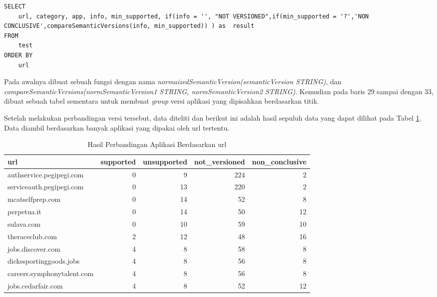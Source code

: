 \begin{lstlisting}[caption={Menampilkan Hasil dari Perbandingan Versi}, label={lst:showitem}]
SELECT 
	url, category, app, info, min_supported, if(info = '', "NOT VERSIONED",if(min_supported = '?','NON CONCLUSIVE',compareSemanticVersions(info, min_supported)) ) as  result
FROM 
	test 
ORDER BY 
	url
\end{lstlisting}
Pada awalnya dibuat sebuah fungsi dengan nama \textit{normaizedSemanticVersion(semanticVersion STRING)}, dan \textit{compareSemanticVersions(normSemanticVersion1 STRING, normSemanticVersion2 STRING)}. Kemudian pada baris 29 sampai dengan 33, dibuat sebuah tabel sementara untuk membuat \textit{group} versi aplikasi yang dipisahkan berdasarkan titik.


Setelah melakukan perbandingan versi tersebut, data diteliti dan berikut ini adalah hasil sepuluh data yang dapat dilihat pada Tabel \ref{table:contoh_langkah5.1}. Data diambil berdasarkan banyak aplikasi yang dipakai oleh url tertentu. 
\begin{table}[H]
\centering
\begin{tabular}{|l|r|r|r|r|}
	\hline
	\textbf{url} & \textbf{supported} & \textbf{unsupported} & \textbf{not\_versioned} & \textbf{non\_conclusive}\\
	\hline
	authservice.pegipegi.com & 0 & 9 & 224 & 2\\
	\hline
	serviceauth.pegipegi.com & 0 & 13 & 220 & 2\\
	\hline
	mcatselfprep.com &0 & 14 & 52 & 8\\
	\hline
	perpetua.it & 0 & 14 & 50 & 12\\
	\hline
	sulava.com & 0 & 10 & 59 & 10\\
	\hline
	
	theraceclub.com & 2 & 12 & 48 & 16\\
	\hline
	
	jobs.discover.com & 4 & 8 & 58 & 8\\
	\hline
	
	dickssportinggoods.jobs & 4 & 8 & 56 & 8 \\
	\hline
	careers.symphonytalent.com & 4 & 8 & 56 & 8 \\
	\hline
	
	jobs.cedarfair.com & 4 & 8 & 52 & 12\\
	\hline
\end{tabular}
\caption{Hasil Perbandingan Aplikasi Berdasarkan url}
\label{table:contoh_langkah5.1}
\end{table}

